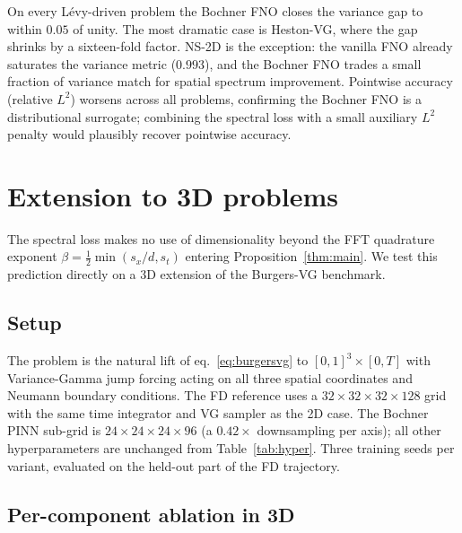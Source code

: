 \documentclass[review,12pt]{elsarticle}
\begin{document}
On every L\'evy-driven problem the Bochner FNO closes the
variance gap to within $0.05$ of unity. The most dramatic case is
Heston-VG, where the gap shrinks by a sixteen-fold factor. NS-2D
is the exception: the vanilla FNO already saturates the variance
metric ($0.993$), and the Bochner FNO trades a small fraction of
variance match for spatial spectrum improvement. Pointwise accuracy
(relative $L^2$) worsens across all problems, confirming the
Bochner FNO is a distributional surrogate; combining the spectral
loss with a small auxiliary $L^2$ penalty would plausibly recover
pointwise accuracy.

\section{Extension to 3D problems}
\label{sec:3d}

The spectral loss makes no use of dimensionality beyond the FFT
quadrature exponent
\(\beta = \tfrac{1}{2}\min(s_x/d, s_t)\) entering
Proposition~\ref{thm:main}. We test this prediction directly on a 3D
extension of the Burgers-VG benchmark.

\subsection{Setup}
\label{subsec:3d-setup}

The problem is the natural lift of eq.~\eqref{eq:burgersvg} to
\([0,1]^3 \times [0, T]\) with Variance-Gamma jump forcing acting on
all three spatial coordinates and Neumann boundary conditions. The FD
reference uses a \(32 \times 32 \times 32 \times 128\) grid with the
same time integrator and VG sampler as the 2D case. The Bochner
PINN sub-grid is \(24 \times 24 \times 24 \times 96\) (a
\(0.42\times\) downsampling per axis); all other hyperparameters are
unchanged from Table~\ref{tab:hyper}. Three training seeds per
variant, evaluated on the held-out part of the FD trajectory.

\subsection{Per-component ablation in 3D}
\end{document}
